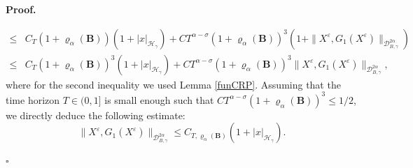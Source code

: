 \documentclass[10pt,a4paper]{article}
\numberwithin{equation}{section}
\newenvironment{proof}[1][\normalfont\bfseries Proof]{%
	\noindent #1.\hspace{0.5em}%
	\ignorespaces%
}{%
	\hfill $\square$%
	\par%
}
\begin{document}
\begin{proof}
\begin{align*}
			\leq & C_{T} (1+\varrho_{\alpha}(\mathbf{B})) (1+|x|_{\mathcal H_\gamma})+CT^{\alpha-\sigma} (1+\varrho_{\alpha}(\mathbf{B}))^3 \left(1+\|X^\varepsilon,G_1(X^\varepsilon)\|_{\mathcal{D}_{B,\gamma}^{2\alpha}} \right) \nonumber\\
			\leq & C_{T} (1+\varrho_{\alpha}(\mathbf{B}))^3  (1+|x|_{\mathcal H_\gamma})
			+CT^{\alpha-\sigma}  (1+\varrho_{\alpha}(\mathbf{B}))^3  \|X^\varepsilon,G_1(X^\varepsilon)\|_{\mathcal{D}_{B,\gamma}^{2\alpha}},
		\end{align*}
		where for the second inequality we used Lemma \ref{funCRP}.
		Assuming that the time horizon $T\in (0,1]$ is small enough such that $C T^{\alpha-\sigma} (1+\varrho_{\alpha}(\mathbf{B}))^3 \leq 1/2$, we directly deduce the following estimate:
		\begin{equation*}
			\|X^\varepsilon,G_1(X^\varepsilon)\|_{\mathcal{D}_{B,\gamma}^{2\alpha}} \leq  C_{T,\varrho_{\alpha}(\mathbf{B}) } (1+|x|_{\mathcal H_\gamma}).
		\end{equation*}
		
		
		

\end{proof}
\end{document}
